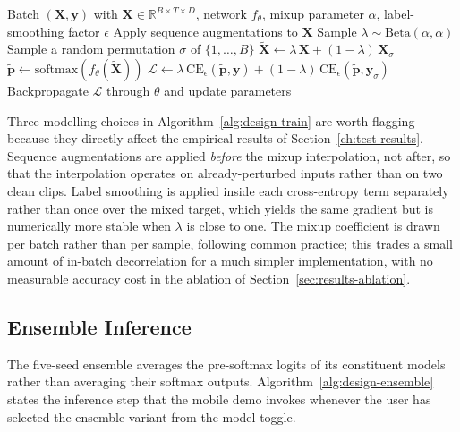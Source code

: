 \begin{algorithm}[!ht]
\caption{Mixup-augmented training step (word classifier).}
\label{alg:design-train}
\begin{algorithmic}[1]
\Require Batch $(\mathbf{X}, \mathbf{y})$ with
         $\mathbf{X} \in \mathbb{R}^{B \times T \times D}$,
         network $f_\theta$, mixup parameter $\alpha$,
         label-smoothing factor $\epsilon$
\State Apply sequence augmentations to $\mathbf{X}$
\State Sample $\lambda \sim \mathrm{Beta}(\alpha, \alpha)$
\State Sample a random permutation $\sigma$ of $\{1, \dots, B\}$
\State $\tilde{\mathbf{X}} \gets
       \lambda\,\mathbf{X} + (1 - \lambda)\,\mathbf{X}_{\sigma}$
\State $\tilde{\mathbf{p}} \gets
       \mathrm{softmax}(f_\theta(\tilde{\mathbf{X}}))$
\State $\mathcal{L} \gets
       \lambda\, \mathrm{CE}_\epsilon(\tilde{\mathbf{p}}, \mathbf{y})
       + (1 - \lambda)\, \mathrm{CE}_\epsilon(\tilde{\mathbf{p}},
       \mathbf{y}_{\sigma})$
\State Backpropagate $\mathcal{L}$ through $\theta$ and update
       parameters
\end{algorithmic}
\end{algorithm}

Three modelling choices in Algorithm~\ref{alg:design-train} are
worth flagging because they directly affect the empirical results
of Section~\ref{ch:test-results}. Sequence augmentations are
applied \emph{before} the mixup interpolation, not after, so that
the interpolation operates on already-perturbed inputs rather than
on two clean clips. Label smoothing is applied inside each
cross-entropy term separately rather than once over the mixed
target, which yields the same gradient but is numerically more
stable when $\lambda$ is close to one. The mixup coefficient is
drawn per batch rather than per sample, following common practice;
this trades a small amount of in-batch decorrelation for a much
simpler implementation, with no measurable accuracy cost in the
ablation of Section~\ref{sec:results-ablation}.

\subsection{Ensemble Inference}
\label{sec:design-algorithm-ensemble}

The five-seed ensemble averages the pre-softmax logits of its
constituent models rather than averaging their softmax outputs.
Algorithm~\ref{alg:design-ensemble} states the inference step that
the mobile demo invokes whenever the user has selected the
ensemble variant from the model toggle.

